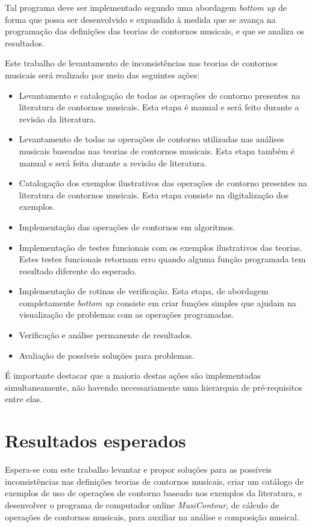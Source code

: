 \documentclass[12pt]{article}
\newcommand{\eng}[1]{\textit{#1}}
\begin{document}
Tal programa deve ser implementado segundo uma abordagem \eng{bottom
  up} \cite{graham94:lisp} de forma que possa ser desenvolvido e
expandido à medida que se avança na programação das definições das
teorias de contornos musicais, e que se analiza os resultados.

Este trabalho de levantamento de inconsistências nas teorias de
contornos musicais será realizado por meio das seguintes ações:

\begin{itemize}
\item Levantamento e catalogação de todas as operações de contorno
  presentes na literatura de contornos musicais. Esta etapa é manual e
  será feito durante a revisão da literatura.
\item Levantamento de todas as operações de contorno utilizadas nas
  análises musicais baseadas nas teorias de contornos musicais. Esta
  etapa também é manual e será feita durante a revisão de literatura.
\item Catalogação dos exemplos ilustrativos das operações de contorno
  presentes na literatura de contornos musicais. Esta etapa consiste
  na digitalização dos exemplos.
\item Implementação das operações de contornos em algoritmos.
\item Implementação de testes funcionais com os exemplos ilustrativos
  das teorias. Estes testes funcionais retornam erro quando alguma
  função programada tem resultado diferente do esperado.
\item Implementação de rotinas de verificação. Esta etapa, de
  abordagem completamente \eng{bottom up} consiste em criar funções
  simples que ajudam na visualização de problemas com as operações
  programadas.
\item Verificação e análise permanente de resultados.
\item Avaliação de possíveis soluções para problemas.
\end{itemize}

É importante destacar que a maioria destas ações são implementadas
simultaneamente, não havendo necessariamente uma hierarquia de
pré-requisitos entre elas.

\section{Resultados esperados}
\label{sec:resultados-esperados}

Espera-se com este trabalho levantar e propor soluções para as
possíveis inconsistências nas definições teorias de contornos
musicais, criar um catálogo de exemplos de uso de operações de
contorno baseado nos exemplos da literatura, e desenvolver o programa
de computador online \eng{MusiContour}, de cálculo de operações de
contornos musicais, para auxiliar na análise e composição musical.
\end{document}
